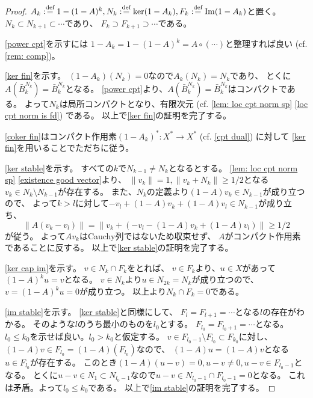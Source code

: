 \documentclass[uplatex]{jsarticle}
\theoremstyle{definition}
\DeclareMathOperator{\im}{\mathrm{Im}}
\newcommand{\dfn}{:\overset{\mbox{{\scriptsize def}}}{=}}
\begin{document}
\begin{proof}
  \(A_k\dfn 1-(1-A)^k, N_k\dfn \ker(1-A_k), F_k\dfn \im(1-A_k)\)と置く。
  \(N_k\subset N_{k+1}\subset \cdots\)であり、
  \(F_k\supset F_{k+1}\supset \cdots\)である。

  \ref{power cpt}を示すには
  \(1-A_k = 1-(1-A)^k = A\circ (\cdots)\)と整理すれば良い
  (cf. \autoref{rem: comp})。

  \ref{ker fin}を示す。
  \((1-A_k)(N_k)=0\)なので\(A_k(N_k)=N_k\)であり、
  とくに\(A(\bar{B}_k^{N_k}) = \bar{B}_k^{N_k}\)となる。
  \ref{power cpt}より、\(A(\bar{B}_k^{N_k}) = \bar{B}_k^{N_k}\)はコンパクトである。
  よって\(N_k\)は局所コンパクトとなり、有限次元
  (cf. \autoref{lem: loc cpt norm sp} \ref{loc cpt norm is fd})
  である。
  以上で\ref{ker fin}の証明を完了する。

  \ref{coker fin}はコンパクト作用素\((1-A_k)^*:X^*\to X^*\)
  (cf. \autoref{cpt dual}) に対して
  \ref{ker fin}を用いることでただちに従う。

  \ref{ker stable}を示す。
  すべての\(k\)で\(N_{k-1}\neq N_k\)となるとする。
  \autoref{lem: loc cpt norm sp} \ref{existence good vector}より、
  \(\|v_k\|=1, \|v_k+N_k\| \geq 1/2\)となる
  \(v_k\in N_k\setminus N_{k-1}\)が存在する。
  また、\(N_k\)の定義より\((1-A)v_k\in N_{k-1}\)が成り立つので、
  よって\(k>l\)に対して\(-v_l+(1-A)v_k+(1-A)v_l\in N_{k-1}\)が成り立ち、
  \[\|A(v_k-v_l)\| = \|v_k + (-v_l-(1-A)v_k+(1-A)v_l)\| \geq 1/2\]
  が従う。
  よって\(Av_k\)はCauchy列ではないため収束せず、
  \(A\)がコンパクト作用素であることに反する。
  以上で\ref{ker stable}の証明を完了する。

  \ref{ker cap im}を示す。
  \(v\in N_k\cap F_k\)をとれば、
  \(v\in F_k\)より、\(u\in X\)があって\((1-A)^ku = v\)となる。
  \(v\in N_k\)より\(u\in N_{2k}=N_k\)が成り立つので、
  \(v = (1-A)^ku = 0\)が成り立つ。
  以上より\(N_k\cap F_k=0\)である。

  \ref{im stable}を示す。
  \ref{ker stable}と同様にして、
  \(F_l = F_{l+1} = \cdots\)となる\(l\)の存在がわかる。
  そのような\(l\)のうち最小のものを\(l_0\)とする。
  \(F_{l_0} = F_{l_0+1} = \cdots \)となる。
  \(l_0 \leq k_0\)を示せば良い。\(l_0 > k_0\)と仮定する。
  \(v\in F_{l_0-1}\setminus F_{l_0}\subset F_{k_0}\)に対し、
  \((1-A) v\in F_{l_0} = (1-A)(F_{l_0})\)なので、
  \((1-A) u = (1-A)v\)となる\(u\in F_{l_0}\)が存在する。
  このとき\((1-A)(u-v) = 0, u-v\neq 0, u-v\in F_{l_0-1}\)となる。
  とくに\(u-v\in N_1\subset N_{l_0-1}\)なので\(u-v\in N_{l_0-1}\cap F_{l_0-1} = 0\)となる。
  これは矛盾。よって\(l_0 \leq k_0\)である。
  以上で\ref{im stable}の証明を完了する。


\end{proof}
\end{document}
